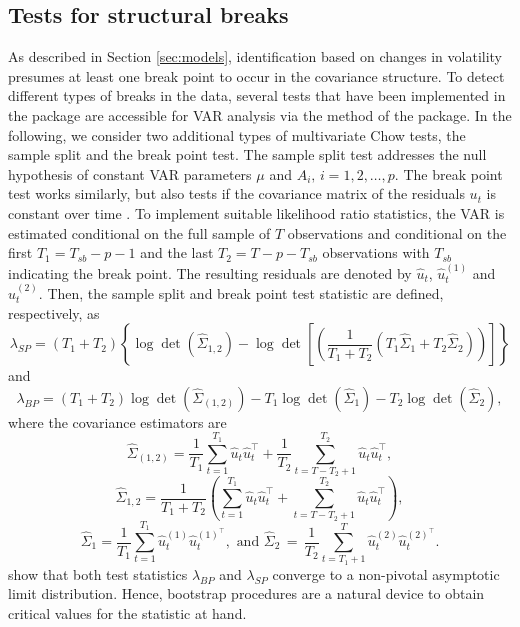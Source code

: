 \documentclass[nojss]{jss}\usepackage[]{graphicx}\usepackage[]{color}
\begin{document}
\subsection{Tests for structural breaks}
As described in Section \ref{sec:models}, identification based on changes in volatility presumes at least one break point to occur in the covariance structure. To detect different types of breaks in the data, several tests that have been implemented in the  package \citep{zeileis2002} are accessible for VAR analysis via the method  of the  package. In the following, we consider two additional types of multivariate Chow tests, the sample split and the break point test. The sample split test addresses the null hypothesis of constant VAR parameters $\mu$ and $A_i,\,i=1,2,\ldots,p$. The break point test works similarly, but also tests if the covariance matrix of the residuals $u_t$ is constant over time \citep[Chapter 3]{appliedtimeseries}. To implement suitable likelihood ratio statistics, the VAR is estimated conditional on the full sample of $T$ observations and conditional on the first $T_1 = T_{sb}-p-1$ and the last $T_2 = T-p-T_{sb}$ observations with $T_{sb}$ indicating the break point.  The resulting residuals are denoted by $\widehat{u}_t$, $\widehat{u}^{(1)}_t$ and $\widehat{u}_t^{(2)}$. Then, the sample split and break point test statistic are defined, respectively, as
\begin{equation}
\lambda_{SP} = (T_1+T_2) \left\{ \log \det( \widehat  \Sigma_{1,2}) - \log \det\left[ \left( \frac{1}{T_1+T_2} (T_1 \widehat \Sigma_{1} + T_2  \widehat \Sigma_{2})\right) \right] \right\}
\end{equation}
and
\begin{equation}
\lambda_{BP} = (T_1+T_2) \log \det( \widehat \Sigma_{(1,2)}) - T_1 \log \det( \widehat \Sigma_{1}) - T_2 \log \det( \widehat \Sigma_{2}),
\end{equation}
where the covariance estimators are
\begin{equation*}
	\widehat \Sigma_{(1,2)} = \frac{1}{T_1} \sum_{t=1}^{T_1} \widehat u_t \widehat u_t^\top + \frac{1}{T_2} \sum_{t=T-T_2+1}^{T_2} \widehat u_t \widehat
	u_t^\top,
\end{equation*}
\begin{equation*}
	\widehat \Sigma_{1,2} = \frac{1}{T_1 + T_2} \left(\sum_{t=1}^{T_1} \widehat u_t \widehat u_t^\top +  \sum_{t=T-T_2+1}^{T_2} \widehat u_t \widehat
	u_t^\top \right),
\end{equation*}
\begin{equation*}
	\widehat \Sigma_{1} =
	\frac{1}{T_1} \sum_{t=1}^{T_1} \widehat{u}^{(1)}_t \widehat{u}^{(1)^\top}_t, \mbox{ and }
	\widehat \Sigma_{2}
	\, = \, \frac{1}{T_2} \sum_{t=T_1+1}^T \widehat{u}_t^{(2)} \widehat{u}_t^{(2)^\top}.
\end{equation*}
\cite{Luetchowtest} show that both test statistics $\lambda_{BP}$ and $\lambda_{SP}$ converge to
a non-pivotal asymptotic limit distribution.
Hence, bootstrap procedures are a natural device to obtain critical values for the statistic at hand.
\end{document}
